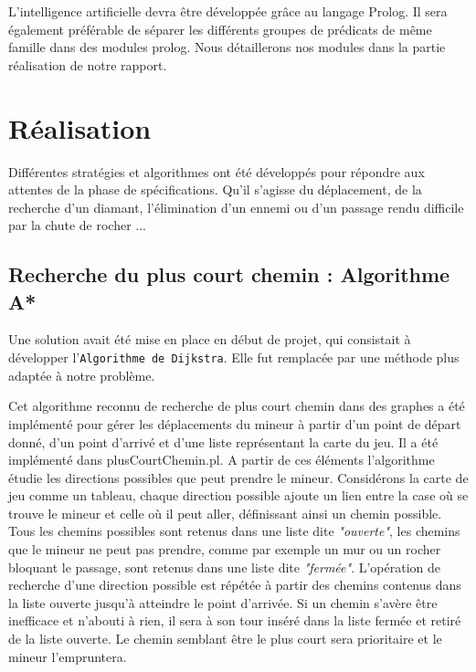\documentclass[a4paper,11pt]{article}
\begin{document}
L'intelligence artificielle devra \^etre d\'evelopp\'ee gr\^ace au langage Prolog. Il sera \'egalement pr\'ef\'erable de s\'eparer les diff\'erents groupes de pr\'edicats de m\^eme famille dans des modules prolog. Nous d\'etaillerons nos modules dans la partie r\'ealisation de notre rapport.
	
	\newpage
	\section{R\'ealisation}
	
Diff\'erentes strat\'egies et algorithmes ont \'et\'e d\'evelopp\'es pour r\'epondre aux attentes de la phase de sp\'ecifications.  Qu'il s'agisse du d\'eplacement, de la recherche d'un diamant, l'\'elimination d'un ennemi ou d'un passage rendu difficile par la chute de rocher ...\\

	\subsection{Recherche du plus court chemin : Algorithme A*}
	
Une solution avait \'et\'e mise en place en d\'ebut de projet, qui consistait \`a d\'evelopper l'\texttt{Algorithme de Dijkstra}. Elle fut remplac\'ee par une m\'ethode plus adapt\'ee \`a notre probl\`eme.
		
Cet algorithme reconnu de recherche de plus court chemin dans des graphes a \'et\'e impl\'ement\'e pour g\'erer les d\'eplacements du mineur \`a partir d'un point de d\'epart donn\'e, d'un point d'arriv\'e et d'une liste repr\'esentant la carte du jeu. Il a \'et\'e impl\'ement\'e dans plusCourtChemin.pl. A partir de ces \'el\'ements l'algorithme \'etudie les directions possibles que peut prendre le mineur. Consid\'erons la carte de jeu comme un tableau, chaque direction possible ajoute un lien entre la case o\`u se trouve le mineur et celle o\`u il peut aller, d\'efinissant ainsi un chemin possible. Tous les chemins possibles sont retenus dans une liste dite \textit{"ouverte"}, les chemins que le mineur ne peut pas prendre, comme par exemple un mur ou un rocher bloquant le passage, sont retenus dans une liste dite \textit{"ferm\'ee"}.  L'op\'eration de recherche d'une direction possible est r\'ep\'et\'ee \`a partir des chemins contenus dans la liste ouverte jusqu'\`a atteindre le point d'arriv\'ee. Si un chemin s'av\`ere \^etre inefficace et n'abouti \`a rien, il sera \`a son tour ins\'er\'e dans la liste ferm\'ee et retir\'e de la liste ouverte. Le chemin semblant \^etre le plus court sera prioritaire et le mineur l'empruntera.
\end{document}
